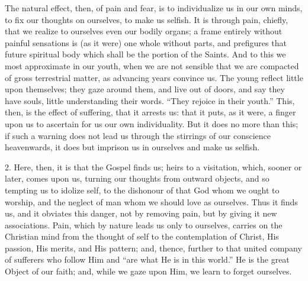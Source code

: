 The natural effect, then, of pain and fear, is to individualize us
in our own minds, to fix our thoughts on ourselves, to make us
selfish. It is through pain, chiefly, that we realize to ourselves
even our bodily organs; a frame entirely without painful sensations is
(as it were) one whole without parts, and prefigures that future
spiritual body which shall be the portion of the Saints. And to this
we most approximate in our youth, when we are not sensible that we are
compacted of gross terrestrial matter, as advancing years convince us.
The young reflect little upon themselves; they gaze around them, and
live out of doors, and say they have souls, little understanding their
words. ``They rejoice in their youth.'' This, then, is the
effect of suffering, that it arrests us: that it puts, as it were, a
finger upon us to ascertain for us our own individuality. But it does
no more than this; if such a warning does not lead us through the
stirrings of our conscience heavenwards, it does but imprison us in
ourselves and make us selfish.

2. Here, then, it is that the Gospel finds us; heirs to a
visitation, which, sooner or later, comes upon us, turning our
thoughts from outward objects, and so tempting us to idolize self, to
the dishonour of that God whom we ought to worship, and the neglect of
man whom we should love as ourselves. Thus it finds us, and it
obviates this danger, not by removing pain, but by giving it new
associations. Pain, which by nature leads us only to ourselves,
carries on the Christian mind from the thought of self to the
contemplation of Christ, His passion, His merits, and His pattern;
and, thence, further to that united company of sufferers who follow
Him and ``are what He is in this world.'' He is the great
Object of our faith; and, while we gaze upon Him, we learn to forget
ourselves.

